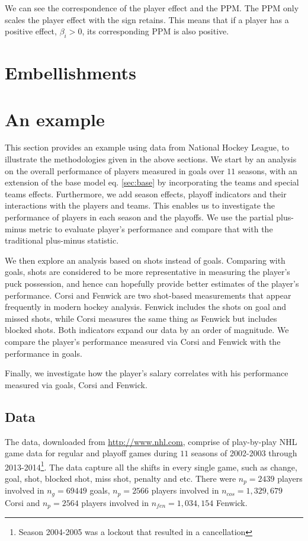We can see the correspondence of the player effect and the PPM. The PPM only scales the player effect with the sign retains. This means that if a player has a positive effect, $\beta_i>0$, its corresponding PPM is also positive. 


\section{Embellishments}
\label{sec:embell}

\section{An example}
\label{sec:example}
This section provides an example using data from National Hockey League, to illustrate the methodologies given in the above sections. We start by an analysis on the overall performance of players measured in goals over $11$ seasons, with an extension of the base model eq. \eqref{sec:base} by incorporating the teams and special teams effects. Furthermore, we add season effects, playoff indicators and their interactions with the players and teams. This enables us to investigate the performance of players in each season and the playoffs. We use the partial plus-minus metric to evaluate player's performance and compare that with the traditional plus-minus statistic.

We then explore an analysis based on shots instead of goals. Comparing with goals, shots are considered to be more representative in measuring the player's puck possession, and hence can hopefully provide better estimates of the player's performance. Corsi and Fenwick are two shot-based measurements that appear frequently in modern hockey analysis. Fenwick includes the shots on goal and missed shots, while Corsi measures the same thing as Fenwick but includes blocked shots. Both indicators expand our data by an order of magnitude. We compare the player's performance measured via Corsi and Fenwick with the performance in goals.

Finally, we investigate how the player's salary correlates with his performance measured via goals, Corsi and Fenwick.

\subsection{Data}
The data, downloaded from \url{http://www.nhl.com}, comprise of play-by-play NHL game data for regular and playoff games during $11$ seasons of 2002-2003 through 2013-2014\footnote{Season 2004-2005 was a lockout that resulted in a cancellation}. The data capture all the shifts in every single game, such as change, goal, shot, blocked shot, miss shot, penalty and etc. There were $n_p=2439$ players involved in $n_g=69449$ goals, $n_p=2566$ players involved in $n_{cos}=1,329,679$ Corsi and $n_p=2564$ players involved in $n_{fen}=1,034,154$ Fenwick.

